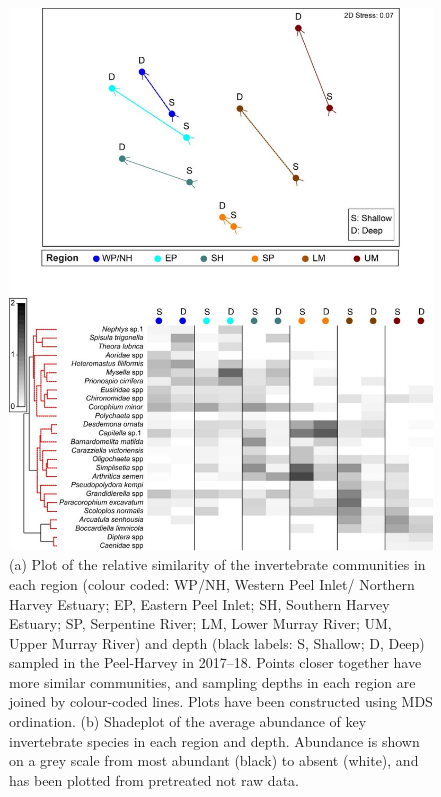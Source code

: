 \documentclass[
]{book}
\begin{document}
\begin{figure}
\includegraphics[width=1\linewidth]{images/BMI/picture11} \caption{(a) Plot of the relative similarity of the invertebrate communities in each region (colour coded: WP/NH, Western Peel Inlet/ Northern Harvey Estuary; EP, Eastern Peel Inlet; SH, Southern Harvey Estuary; SP, Serpentine River; LM, Lower Murray River; UM, Upper Murray River) and depth (black labels: S, Shallow; D, Deep) sampled in the Peel-Harvey in 2017–18. Points closer together have more similar communities, and sampling depths in each region are joined by colour-coded lines. Plots have been constructed using MDS ordination. (b) Shadeplot of the average abundance of key invertebrate species in each region and depth. Abundance is shown on a grey scale from most abundant (black) to absent (white), and has been plotted from pretreated not raw data.}\label{fig:BMI-pic11}
\end{figure}
\end{document}
